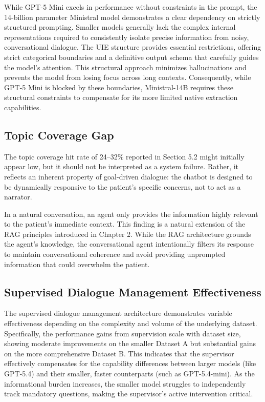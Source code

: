 While GPT-5 Mini excels in performance without constraints in the prompt, the 14-billion parameter Ministral model demonstrates a clear dependency on strictly structured prompting. 
Smaller models generally lack the complex internal representations required to consistently isolate precise information from noisy, conversational dialogue. 
The UIE structure provides essential restrictions, offering strict categorical boundaries and a definitive output schema that carefully guides the model's attention. 
This structural approach minimizes hallucinations and prevents the model from losing focus across long contexts. 
Consequently, while GPT-5 Mini is blocked by these boundaries, Ministral-14B requires these structural constraints to compensate for its more limited native extraction capabilities.

\subsection{Topic Coverage Gap}

The topic coverage hit rate of 24--32\% reported in Section 5.2 might initially appear low, but it should not be interpreted as a system failure. 
Rather, it reflects an inherent property of goal-driven dialogue: the chatbot is designed to be dynamically responsive to the patient's specific concerns, not to act as a narrator. 

In a natural conversation, an agent only provides the information highly relevant to the patient's immediate context. 
This finding is a natural extension of the RAG principles introduced in Chapter 2. 
While the RAG architecture grounds the agent's knowledge, the conversational agent intentionally filters its response to maintain conversational coherence and avoid providing unprompted information that could overwhelm the patient.

\subsection{Supervised Dialogue Management Effectiveness}

The supervised dialogue management architecture demonstrates variable effectiveness depending on the complexity and volume of the underlying dataset. 
Specifically, the performance gains from supervision scale with dataset size, showing moderate improvements on the smaller Dataset A but substantial gains on the more comprehensive Dataset B. 
This indicates that the supervisor effectively compensates for the capability differences between larger models (like GPT-5.4) and their smaller, faster counterparts (such as GPT-5.4-mini). 
As the informational burden increases, the smaller model struggles to independently track mandatory questions, making the supervisor's active intervention critical. 

